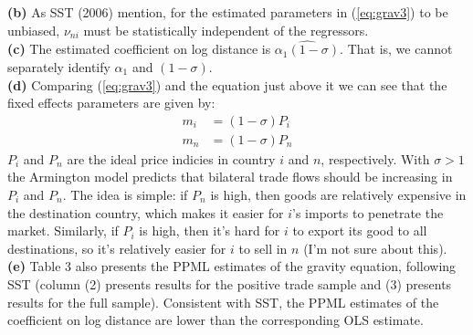 \documentclass[12pt]{article}
\begin{document}
\textbf{(b)} As SST (2006) mention, for the estimated parameters in (\ref{eq:grav3}) to be unbiased, $\nu_{ni}$ must be statistically independent of the regressors.  \\

\textbf{(c)} The estimated coefficient on log distance is $\widehat{\alpha_1(1-\sigma)}$. That is, we cannot separately identify $\alpha_1$ and $(1-\sigma)$.\\

\textbf{(d)} Comparing (\ref{eq:grav3}) and the equation just above it we can see that the fixed effects parameters are given by:
\begin{align*}
m_i &= (1-\sigma)P_i\\
m_n &= (1-\sigma)P_n
\end{align*}
$P_i$ and $P_n$ are the ideal price indicies in country $i$ and $n$, respectively. With $\sigma>1$ the Armington model predicts that bilateral trade flows should be increasing in $P_i$ and $P_n$. The idea is simple: if $P_n$ is high, then goods are relatively expensive in the destination country, which makes it easier for $i$'s imports to penetrate the market. Similarly, if $P_i$ is high, then it's hard for $i$ to export its good to all destinations, so it's relatively easier for $i$ to sell in $n$ (I'm not sure about this).\\

\textbf{(e)} Table 3 also presents the PPML estimates of the gravity equation, following SST  (column (2) presents results for the positive trade sample and (3) presents results for the full sample). Consistent with SST, the PPML estimates of the coefficient on log distance are lower than the corresponding OLS estimate.
\end{document}
